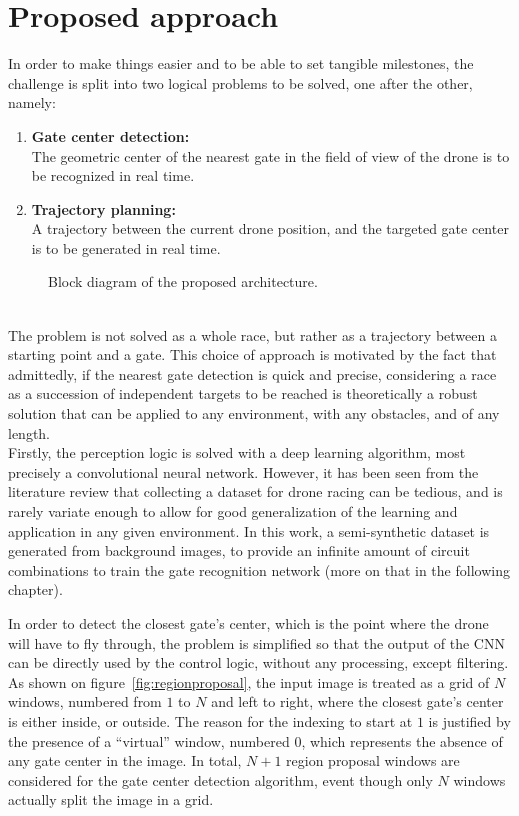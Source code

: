 \section{Proposed approach}

In order to make things easier and to be able to set tangible milestones, the
challenge is split into two logical problems to be solved, one after the
other, namely:
\begin{enumerate}
	\item{\textbf{Gate center detection:\\}
			The geometric center of the nearest gate in the field of view of the
			drone is to be recognized in real time.
	}
	\item{\textbf{Trajectory planning:\\}
			A trajectory between the current drone position, and the targeted gate
			center is to be generated in real time.
	}
\end{enumerate}

\begin{figure}[h!]
	\centering
	
	\caption{Block diagram of the proposed architecture.}
	\label{fig:block-system}
\end{figure}

~\\The problem is not solved as a whole race, but rather as a trajectory
between a starting point and a gate. This choice of approach is motivated by
the fact that admittedly, if the nearest gate detection is quick and precise,
considering a race as a succession of independent targets to be reached is
theoretically a robust solution that can be applied to any environment, with any
obstacles, and of any length.\\

Firstly, the perception logic is solved with a deep learning algorithm, most
precisely a convolutional neural network. However, it has been seen from
the literature review that collecting a dataset for drone racing can be
tedious, and is rarely variate enough to allow for good generalization of the
learning and application in any given environment. In this work, a
semi-synthetic dataset is generated from background images, to provide an
infinite amount of circuit combinations to train the gate recognition network
(more on that in the following chapter).

In order to detect the closest gate's center, which is the point where the
drone will have to fly through, the problem is simplified so that the output of
the CNN can be directly used by the control logic, without any processing,
except filtering. As shown on figure~\ref{fig:regionproposal}, the input image
is treated as a grid of $N$ windows, numbered from $1$ to $N$ and left to
right, where the closest gate's center is either inside, or outside. The reason
for the indexing to start at $1$ is justified by the presence of a ``virtual''
window, numbered $0$, which represents the absence of any gate center in the
image. In total, $N+1$ region proposal windows are considered for the gate
center detection algorithm, event though only $N$ windows actually split the
image in a grid.

